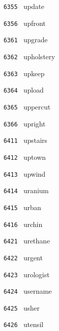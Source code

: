 \documentclass[11pt]{article}
\begin{document}
\begin{multicols}{6}
\noindent \texttt{ 6355 } \hspace{1mm} update  \par
\noindent \texttt{ 6356 } \hspace{1mm} upfront  \par
\noindent \texttt{ 6361 } \hspace{1mm} upgrade  \par
\noindent \texttt{ 6362 } \hspace{1mm} upholstery  \par
\noindent \texttt{ 6363 } \hspace{1mm} upkeep  \par
\noindent \texttt{ 6364 } \hspace{1mm} upload  \par
\noindent \texttt{ 6365 } \hspace{1mm} uppercut  \par
\noindent \texttt{ 6366 } \hspace{1mm} upright  \par
\noindent \texttt{ 6411 } \hspace{1mm} upstairs  \par
\noindent \texttt{ 6412 } \hspace{1mm} uptown  \par
\noindent \texttt{ 6413 } \hspace{1mm} upwind  \par
\noindent \texttt{ 6414 } \hspace{1mm} uranium  \par
\noindent \texttt{ 6415 } \hspace{1mm} urban  \par
\noindent \texttt{ 6416 } \hspace{1mm} urchin  \par
\noindent \texttt{ 6421 } \hspace{1mm} urethane  \par
\noindent \texttt{ 6422 } \hspace{1mm} urgent  \par
\noindent \texttt{ 6423 } \hspace{1mm} urologist  \par
\noindent \texttt{ 6424 } \hspace{1mm} username  \par
\noindent \texttt{ 6425 } \hspace{1mm} usher  \par
\noindent \texttt{ 6426 } \hspace{1mm} utensil  \par

\end{multicols}
\end{document}
